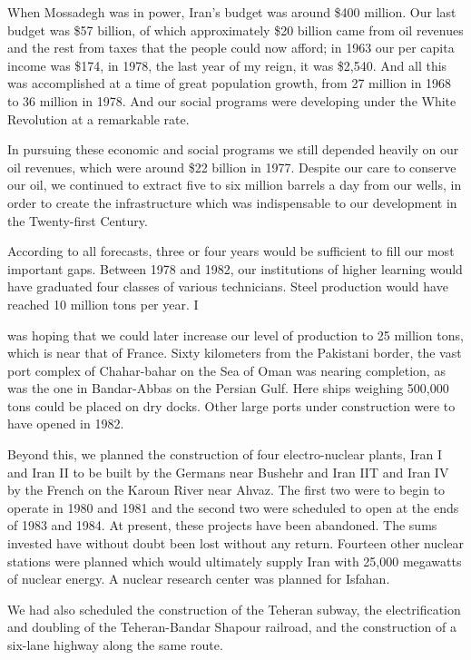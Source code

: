 When Mossadegh was in power, Iran’s budget was around \$400 million. Our last budget was \$57 billion, of which approximately \$20 billion came from oil revenues and the rest from taxes that the people could now afford; in 1963 our per capita income was \$174, in 1978, the last year of my reign, it was \$2,540. And all this was accomplished at a time of great population growth, from 27 million in 1968 to 36 million in 1978. And our social programs were developing under the White Revolution at a remarkable rate. 

In pursuing these economic and social programs we still depended heavily on our oil revenues, which were around \$22 billion in 1977. Despite our care to conserve our oil, we continued to extract five to six million barrels a day from our wells, in order to create the infrastructure which was indispensable to our development in the Twenty-first Century. 

According to all forecasts, three or four years would be sufficient to fill our most important gaps. Between 1978 and 1982, our institutions of higher learning would have graduated four classes of various technicians. Steel production would have reached 10 million tons per year. I 


was hoping that we could later increase our level of production to 25 million tons, which is near that of France. Sixty kilometers from the Pakistani border, the vast port complex of Chahar-bahar on the Sea of Oman was nearing completion, as was the one in Bandar-Abbas on the Persian Gulf. Here ships weighing 500,000 tons could be placed on dry docks. Other large ports under construction were to have opened in 1982. 

Beyond this, we planned the construction of four electro-nuclear plants, Iran I and Iran II to be built by the Germans near Bushehr and Iran IIT and Iran IV by the French on the Karoun River near Ahvaz. The first two were to begin to operate in 1980 and 1981 and the second two were scheduled to open at the ends of 1983 and 1984. At present, these projects have been abandoned. The sums invested have without doubt been lost without any return. Fourteen other nuclear stations were planned which would ultimately supply Iran with 25,000 megawatts of nuclear energy. A nuclear research center was planned for Isfahan. 

We had also scheduled the construction of the Teheran subway, the electrification and doubling of the Teheran-Bandar Shapour railroad, and the construction of a six-lane highway along the same route. 

